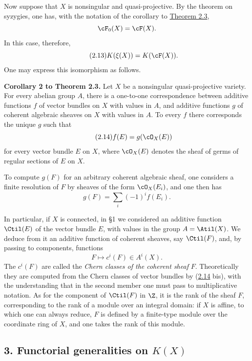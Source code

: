 Now suppose that $X$ is nonsingular and quasi-projective. By the theorem on syzygies, one has, with the notation of the corollary to \hyperlink{sga6.e00.thm.2-3}{Theorem 2.3},
\[
 \cF_0(X)=\cF(X).
\]
In this case, therefore,
\begin{equation}\tag{2.13}
 K(\xi(X))=K(\cF(X)).
\end{equation}
One may express this isomorphism as follows.

\textbf{Corollary 2 to Theorem 2.3.} Let $X$ be a nonsingular quasi-projective variety. For every abelian group $A$, there is a one-to-one correspondence between additive functions $f$ of vector bundles on $X$ with values in $A$, and additive functions $g$ of coherent algebraic sheaves on $X$ with values in $A$. To every $f$ there corresponds the unique $g$ such that
\begin{equation}\tag{2.14}
 f(E)=g(\cO_X(E))
\end{equation}
for every vector bundle $E$ on $X$, where $\cO_X(E)$ denotes the sheaf of germs of regular sections of $E$ on $X$.

To compute $g(F)$ for an arbitrary coherent algebraic sheaf, one considers a finite resolution of $F$ by sheaves of the form $\cO_X(E_i)$, and one then has
\begin{equation}\tag{2.14 bis}
 g(F)=\sum_i (-1)^i f(E_i).
\end{equation}

In particular, if $X$ is connected, in \S 1 we considered an additive function $\Ctil(E)$ of the vector bundle $E$, with values in the group $A=\Atil(X)$. We deduce from it an additive function of coherent sheaves, say $\Ctil(F)$, and, by passing to components, functions
\[
 F\longmapsto c^i(F)\in A^i(X).
\]
The $c^i(F)$ are called the \emph{Chern classes of the coherent sheaf} $F$. Theoretically they are computed from the Chern classes of vector bundles by (\hyperlink{sga6.e00.eq.2-14}{2.14} bis), with the understanding that in the second member one must pass to multiplicative notation. As for the component of $\Ctil(F)$ in $\Z$, it is the rank of the sheaf $F$, corresponding to the rank of a module over an integral domain: if $X$ is affine, to which one can always reduce, $F$ is defined by a finite-type module over the coordinate ring of $X$, and one takes the rank of this module.

\subsection*{3. Functorial generalities on $K(X)$}

